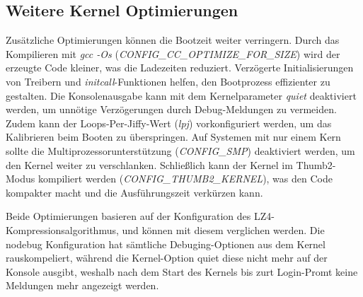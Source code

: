 \subsection{Weitere Kernel Optimierungen}
Zusätzliche Optimierungen können die Bootzeit weiter verringern. Durch das Kompilieren mit \textit{gcc -Os}
(\textit{CONFIG\_CC\_OPTIMIZE\_FOR\_SIZE}) wird der erzeugte Code kleiner, was die Ladezeiten reduziert.
Verzögerte Initialisierungen von Treibern und \textit{initcall}-Funktionen helfen, den Bootprozess effizienter
zu gestalten. Die Konsolenausgabe kann mit dem Kernelparameter \textit{quiet} deaktiviert werden, um unnötige
Verzögerungen durch Debug-Meldungen zu vermeiden. Zudem kann der Loops-Per-Jiffy-Wert (\textit{lpj})
vorkonfiguriert werden, um das Kalibrieren beim Booten zu überspringen. Auf Systemen mit nur einem Kern sollte
die Multiprozessorunterstützung (\textit{CONFIG\_SMP}) deaktiviert werden, um den Kernel weiter zu
verschlanken. Schließlich kann der Kernel im Thumb2-Modus kompiliert werden (\textit{CONFIG\_THUMB2\_KERNEL}),
was den Code kompakter macht und die Ausführungszeit verkürzen kann.

\begin{figure}[H]
	\centering
\end{figure}

Beide Optimierungen basieren auf der Konfiguration des LZ4-Kompressionsalgorithmus, und können mit diesem
verglichen werden. Die nodebug Konfiguration hat sämtliche Debuging-Optionen aus dem Kernel rauskompeliert,
während die Kernel-Option quiet diese nicht mehr auf der Konsole ausgibt, weshalb nach dem Start des Kernels
bis zurt Login-Promt keine Meldungen mehr angezeigt werden.
